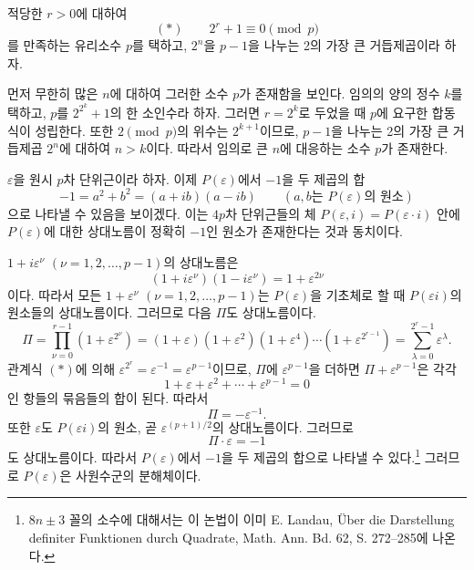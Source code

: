 
적당한 $r>0$에 대하여
\[
        (*)\qquad 2^r+1\equiv0\pmod p
\]
를 만족하는 유리소수 $p$를 택하고, $2^n$을 $p-1$을 나누는 2의 가장 큰 거듭제곱이라 하자.

먼저 무한히 많은 $n$에 대하여 그러한 소수 $p$가 존재함을 보인다. 임의의 양의 정수 $k$를 택하고, $p$를 $2^{2^k}+1$의 한 소인수라 하자. 그러면 $r=2^k$로 두었을 때 $p$에 요구한 합동식이 성립한다. 또한 $2\pmod p$의 위수는 $2^{k+1}$이므로, $p-1$을 나누는 2의 가장 큰 거듭제곱 $2^n$에 대하여 $n>k$이다. 따라서 임의로 큰 $n$에 대응하는 소수 $p$가 존재한다.

$\varepsilon$을 원시 $p$차 단위근이라 하자. 이제 $P(\varepsilon)$에서 $-1$을 두 제곱의 합
\[
        -1=a^2+b^2=(a+ib)(a-ib)\qquad (a,b\text{는 }P(\varepsilon)\text{의 원소})
\]
으로 나타낼 수 있음을 보이겠다. 이는 $4p$차 단위근들의 체 $P(\varepsilon,i)=P(\varepsilon\cdot i)$ 안에 $P(\varepsilon)$에 대한 상대노름이 정확히 $-1$인 원소가 존재한다는 것과 동치이다.

$1+i\varepsilon^\nu$ $(\nu=1,2,\ldots,p-1)$의 상대노름은
\[
(1+i\varepsilon^\nu)(1-i\varepsilon^\nu)=1+\varepsilon^{2\nu}
\]
이다. 따라서 모든 $1+\varepsilon^\nu$ $(\nu=1,2,\ldots,p-1)$는 $P(\varepsilon)$을 기초체로 할 때 $P(\varepsilon i)$의 원소들의 상대노름이다. 그러므로 다음 $\Pi$도 상대노름이다.
\[
\Pi=\prod_{\nu=0}^{r-1}(1+\varepsilon^{2^\nu})
=(1+\varepsilon)(1+\varepsilon^2)(1+\varepsilon^4)\cdots(1+\varepsilon^{2^{r-1}})
=\sum_{\lambda=0}^{2^r-1}\varepsilon^\lambda.
\]
관계식 $(*)$에 의해 $\varepsilon^{2^r}=\varepsilon^{-1}=\varepsilon^{p-1}$이므로, $\Pi$에 $\varepsilon^{p-1}$을 더하면 $\Pi+\varepsilon^{p-1}$은 각각
\[
1+\varepsilon+\varepsilon^2+\cdots+\varepsilon^{p-1}=0
\]
인 항들의 묶음들의 합이 된다. 따라서
\[
        \Pi=-\varepsilon^{-1}.
\]
또한 $\varepsilon$도 $P(\varepsilon i)$의 원소, 곧 $\varepsilon^{(p+1)/2}$의 상대노름이다. 그러므로
\[
        \Pi\cdot\varepsilon=-1
\]
도 상대노름이다. 따라서 $P(\varepsilon)$에서 $-1$을 두 제곱의 합으로 나타낼 수 있다.\footnote{$8n\pm3$ 꼴의 소수에 대해서는 이 논법이 이미 E. Landau, Über die Darstellung definiter Funktionen durch Quadrate, Math. Ann. Bd. 62, S. 272--285에 나온다.} 그러므로 $P(\varepsilon)$은 사원수군의 분해체이다.


